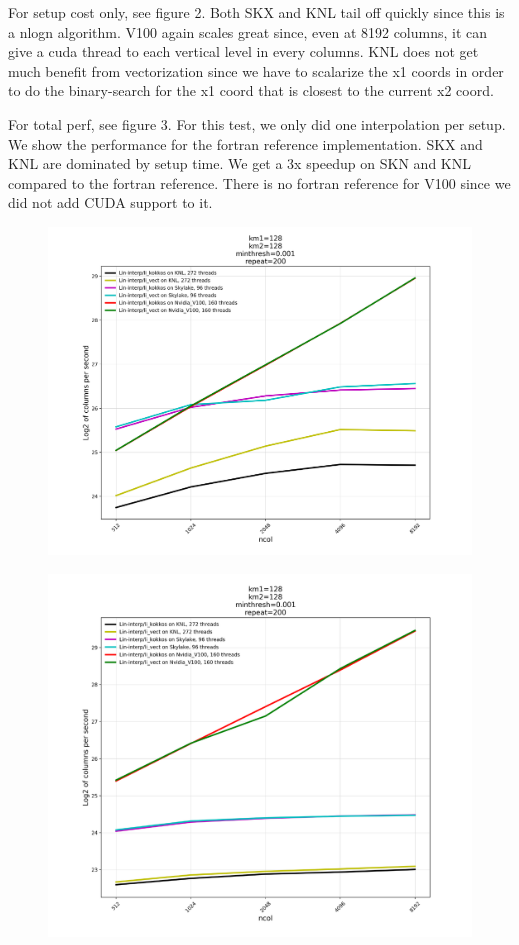 \documentclass[10pt,twocolumn]{article}
\begin{document}
For setup cost only, see figure 2. Both SKX and KNL tail off quickly since this is a nlogn algorithm. V100
again scales great since, even at 8192 columns, it can give a cuda thread to each vertical level in every
columns. KNL does not get much benefit from vectorization since we have to scalarize the x1 coords in order
to do the binary-search for the x1 coord that is closest to the current x2 coord.

For total perf, see figure 3. For this test, we only did one interpolation per setup. We show
the performance for the fortran reference implementation. SKX and KNL are dominated by setup
time. We get a 3x speedup on SKN and KNL compared to the fortran reference. There is no fortran
reference for V100 since we did not add CUDA support to it.

\onecolumn

\begin{figure}[hbt]
  \centering
  \includegraphics{final-li.pdf}
\end{figure}

\begin{figure}[hbt]
  \centering
  \includegraphics{final-setup.pdf}
\end{figure}
\end{document}
